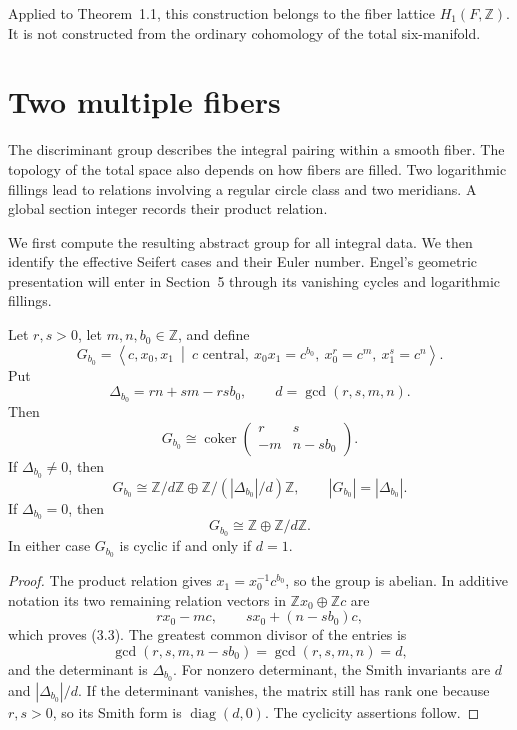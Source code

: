 \documentclass[11pt]{article}
\numberwithin{equation}{section}
\begin{document}
Applied to Theorem~1.1, this construction belongs to the fiber lattice
$H_1(F,\mathbb Z)$.  It is not constructed from the ordinary cohomology of
the total six-manifold.

\section{Two multiple fibers}

The discriminant group describes the integral pairing within a smooth
fiber. The topology of the total space also depends on how fibers are
filled. Two logarithmic fillings lead to relations involving a regular
circle class and two meridians. A global section integer records their
product relation.

We first compute the resulting abstract group for all integral data.
We then identify the effective Seifert cases and their Euler number.
Engel's geometric presentation will enter in Section~5 through its
vanishing cycles and logarithmic fillings.

\begin{theorem}
Let $r,s>0$, let $m,n,b_0\in\mathbb Z$, and define
\[
 G_{b_0}=\left\langle c,x_0,x_1\ \middle|\
 c\text{ central},\ x_0x_1=c^{b_0},\ x_0^r=c^m,\ x_1^s=c^n
 \right\rangle.                                                   \tag{3.1}
\]
Put
\[
 \Delta_{b_0}=rn+sm-rsb_0,\qquad d=\gcd(r,s,m,n).                \tag{3.2}
\]
Then
\[
 G_{b_0}\cong\operatorname{coker}
 \begin{pmatrix}r&s\\-m&n-sb_0\end{pmatrix}.                     \tag{3.3}
\]
If $\Delta_{b_0}\ne0$, then
\[
 G_{b_0}\cong\mathbb Z/d\mathbb Z
       \oplus\mathbb Z/(|\Delta_{b_0}|/d)\mathbb Z,\qquad
 |G_{b_0}|=|\Delta_{b_0}|.                                        \tag{3.4}
\]
If $\Delta_{b_0}=0$, then
\[
                    G_{b_0}\cong\mathbb Z\oplus\mathbb Z/d\mathbb Z.
                                                                    \tag{3.5}
\]
In either case $G_{b_0}$ is cyclic if and only if $d=1$.
\end{theorem}

\begin{proof}
The product relation gives $x_1=x_0^{-1}c^{b_0}$, so the group is abelian.
In additive notation its two remaining relation vectors in
$\mathbb Zx_0\oplus\mathbb Zc$ are
\[
          rx_0-mc,\qquad sx_0+(n-sb_0)c,
\]
which proves (3.3).  The greatest common divisor of the entries is
\[
 \gcd(r,s,m,n-sb_0)=\gcd(r,s,m,n)=d,
\]
and the determinant is $\Delta_{b_0}$.  For nonzero determinant, the Smith
invariants are $d$ and $|\Delta_{b_0}|/d$.  If the determinant vanishes, the
matrix still has rank one because $r,s>0$, so its Smith form is
$\operatorname{diag}(d,0)$.  The cyclicity assertions follow.
\end{proof}
\end{document}
